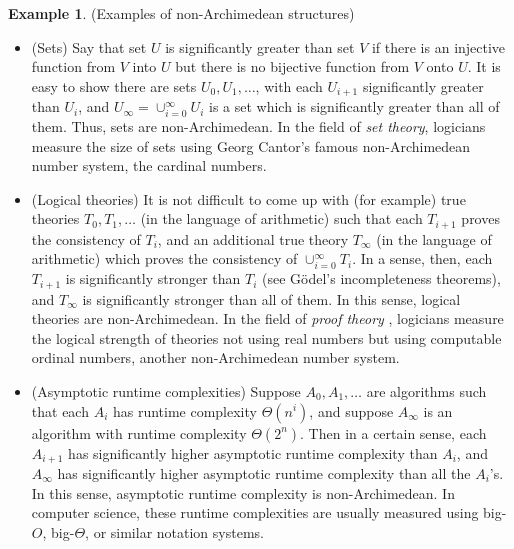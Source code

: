 \documentclass[reqno]{article}
\theoremstyle{definition}
\newtheorem{example}[theorem]{Example}
\begin{document}
\begin{example}
\label{nonexamples}
(Examples of non-Archimedean structures)
    \begin{itemize}
        \item
        (Sets)
        Say that set $U$ is significantly greater than set $V$ if there is an injective
        function from $V$ into $U$ but there is no bijective function from $V$
        onto $U$. It is easy to show there are sets $U_0,U_1,\ldots$, with each
        $U_{i+1}$ significantly greater than $U_i$, and $U_\infty=\cup_{i=0}^\infty U_i$
        is a set which is significantly greater than all of them. Thus, sets are
        non-Archimedean. In the field of \emph{set theory}, logicians measure
        the size of sets using Georg Cantor's famous non-Archimedean number system,
        the cardinal numbers.
        \item
        (Logical theories)
        It is not difficult to come up with (for example) true
        theories $T_0,T_1,\ldots$ (in the language of arithmetic) such that
        each $T_{i+1}$ proves the consistency of $T_i$, and an additional
        true theory $T_\infty$ (in the language of arithmetic)
        which proves the consistency of $\cup_{i=0}^\infty T_i$.
        In a sense, then, each $T_{i+1}$ is significantly stronger than $T_i$
        (see G\"odel's incompleteness theorems), and $T_\infty$ is
        significantly stronger than all of them. In this sense, logical theories
        are non-Archimedean. In the field
        of \emph{proof theory} \cite{pohlers2008proof},
        logicians measure the logical strength of theories not using real numbers
        but using computable ordinal numbers, another non-Archimedean number system.
        \item
        (Asymptotic runtime complexities)
        Suppose $A_0,A_1,\ldots$ are algorithms such that each $A_i$ has
        runtime complexity $\Theta(n^i)$, and suppose $A_\infty$ is an algorithm
        with runtime complexity $\Theta(2^n)$. Then in a certain sense, each
        $A_{i+1}$ has significantly higher asymptotic runtime complexity than $A_i$,
        and $A_\infty$ has significantly higher asymptotic runtime complexity than all
        the $A_i$'s. In this sense, asymptotic runtime complexity is non-Archimedean.
        In computer science, these runtime complexities are usually measured using
        big-$O$, big-$\Theta$, or similar notation systems.
    \end{itemize}
\end{example}
\end{document}
